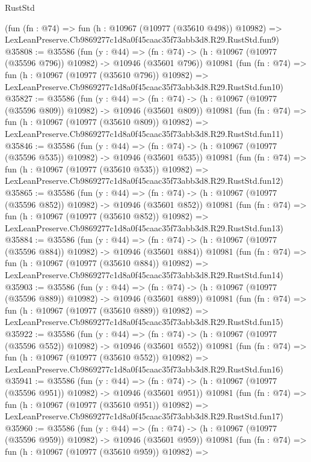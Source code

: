 \begin{lexlean}{RustStd}
\begin{coremodule}
    (fun (fn : @74) =>
    fun (h : @10967 (@10977 (@35610 @498)) @10982) =>
    LexLeanPreserve.Cb9869277c1d8a0f45caac35f73abb3d8.R29.RustStd.fun9)
@35808 := @35586
    (fun (y : @44) =>
    (fn : @74) -> (h : @10967 (@10977 (@35596 @796)) @10982) -> @10946 (@35601 @796))
    @10981
    (fun (fn : @74) =>
    fun (h : @10967 (@10977 (@35610 @796)) @10982) =>
    LexLeanPreserve.Cb9869277c1d8a0f45caac35f73abb3d8.R29.RustStd.fun10)
@35827 := @35586
    (fun (y : @44) =>
    (fn : @74) -> (h : @10967 (@10977 (@35596 @809)) @10982) -> @10946 (@35601 @809))
    @10981
    (fun (fn : @74) =>
    fun (h : @10967 (@10977 (@35610 @809)) @10982) =>
    LexLeanPreserve.Cb9869277c1d8a0f45caac35f73abb3d8.R29.RustStd.fun11)
@35846 := @35586
    (fun (y : @44) =>
    (fn : @74) -> (h : @10967 (@10977 (@35596 @535)) @10982) -> @10946 (@35601 @535))
    @10981
    (fun (fn : @74) =>
    fun (h : @10967 (@10977 (@35610 @535)) @10982) =>
    LexLeanPreserve.Cb9869277c1d8a0f45caac35f73abb3d8.R29.RustStd.fun12)
@35865 := @35586
    (fun (y : @44) =>
    (fn : @74) -> (h : @10967 (@10977 (@35596 @852)) @10982) -> @10946 (@35601 @852))
    @10981
    (fun (fn : @74) =>
    fun (h : @10967 (@10977 (@35610 @852)) @10982) =>
    LexLeanPreserve.Cb9869277c1d8a0f45caac35f73abb3d8.R29.RustStd.fun13)
@35884 := @35586
    (fun (y : @44) =>
    (fn : @74) -> (h : @10967 (@10977 (@35596 @884)) @10982) -> @10946 (@35601 @884))
    @10981
    (fun (fn : @74) =>
    fun (h : @10967 (@10977 (@35610 @884)) @10982) =>
    LexLeanPreserve.Cb9869277c1d8a0f45caac35f73abb3d8.R29.RustStd.fun14)
@35903 := @35586
    (fun (y : @44) =>
    (fn : @74) -> (h : @10967 (@10977 (@35596 @889)) @10982) -> @10946 (@35601 @889))
    @10981
    (fun (fn : @74) =>
    fun (h : @10967 (@10977 (@35610 @889)) @10982) =>
    LexLeanPreserve.Cb9869277c1d8a0f45caac35f73abb3d8.R29.RustStd.fun15)
@35922 := @35586
    (fun (y : @44) =>
    (fn : @74) -> (h : @10967 (@10977 (@35596 @552)) @10982) -> @10946 (@35601 @552))
    @10981
    (fun (fn : @74) =>
    fun (h : @10967 (@10977 (@35610 @552)) @10982) =>
    LexLeanPreserve.Cb9869277c1d8a0f45caac35f73abb3d8.R29.RustStd.fun16)
@35941 := @35586
    (fun (y : @44) =>
    (fn : @74) -> (h : @10967 (@10977 (@35596 @951)) @10982) -> @10946 (@35601 @951))
    @10981
    (fun (fn : @74) =>
    fun (h : @10967 (@10977 (@35610 @951)) @10982) =>
    LexLeanPreserve.Cb9869277c1d8a0f45caac35f73abb3d8.R29.RustStd.fun17)
@35960 := @35586
    (fun (y : @44) =>
    (fn : @74) -> (h : @10967 (@10977 (@35596 @959)) @10982) -> @10946 (@35601 @959))
    @10981
    (fun (fn : @74) =>
    fun (h : @10967 (@10977 (@35610 @959)) @10982) =>

\end{coremodule}
\end{lexlean}
